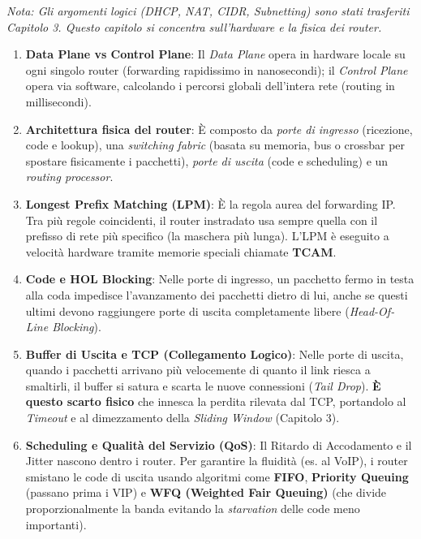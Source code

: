 \documentclass[a4paper,12pt]{report}
\begin{document}
\begin{tcolorbox}[colback=unibolight, colframe=uniboblue, title=\bfseries Concetti chiave del Capitolo 5 (Data Plane), breakable]

\textit{Nota: Gli argomenti logici (DHCP, NAT, CIDR, Subnetting) sono stati trasferiti  Capitolo 3. Questo capitolo si concentra sull'hardware e la fisica dei router.}

\begin{enumerate}
    \item \textbf{Data Plane vs Control Plane}: Il \textit{Data Plane} opera in hardware locale su ogni singolo router (forwarding rapidissimo in nanosecondi); il \textit{Control Plane} opera via software, calcolando i percorsi globali dell'intera rete (routing in millisecondi).
    
    \item \textbf{Architettura fisica del router}: È composto da \textit{porte di ingresso} (ricezione, code e lookup), una \textit{switching fabric} (basata su memoria, bus o crossbar per spostare fisicamente i pacchetti), \textit{porte di uscita} (code e scheduling) e un \textit{routing processor}.
    
    \item \textbf{Longest Prefix Matching (LPM)}: È la regola aurea del forwarding IP. Tra più regole coincidenti, il router instradato usa sempre quella con il prefisso di rete più specifico (la maschera più lunga). L'LPM è eseguito a velocità hardware tramite memorie speciali chiamate \textbf{TCAM}.
    
    \item \textbf{Code e HOL Blocking}: Nelle porte di ingresso, un pacchetto fermo in testa alla coda impedisce l'avanzamento dei pacchetti dietro di lui, anche se questi ultimi devono raggiungere porte di uscita completamente libere (\textit{Head-Of-Line Blocking}).
    
    \item \textbf{Buffer di Uscita e TCP (Collegamento Logico)}: Nelle porte di uscita, quando i pacchetti arrivano più velocemente di quanto il link riesca a smaltirli, il buffer si satura e scarta le nuove connessioni (\textit{Tail Drop}). \textbf{È questo scarto fisico} che innesca la perdita rilevata dal TCP, portandolo al \textit{Timeout} e al dimezzamento della \textit{Sliding Window} (Capitolo 3).
    
    \item \textbf{Scheduling e Qualità del Servizio (QoS)}: Il Ritardo di Accodamento e il Jitter nascono dentro i router. Per garantire la fluidità (es. al VoIP), i router smistano le code di uscita usando algoritmi come \textbf{FIFO}, \textbf{Priority Queuing} (passano prima i VIP) e \textbf{WFQ (Weighted Fair Queuing)} (che divide proporzionalmente la banda evitando la \textit{starvation} delle code meno importanti).
    

\end{enumerate}
\end{tcolorbox}
\end{document}
